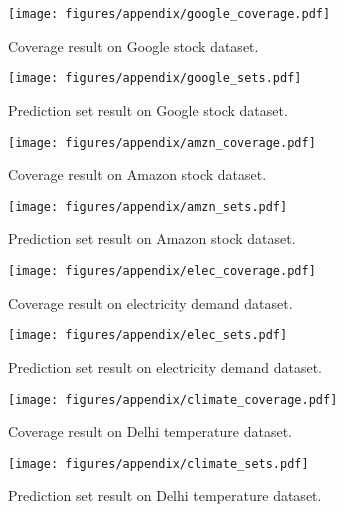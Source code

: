 \begin{figure*}[h]
  \centering
  \texttt{[image: figures/appendix/google\_coverage.pdf]}
  \caption{Coverage result on Google stock dataset.}
  \label{figure more detail1}
\end{figure*}
\begin{figure*}[h]
  \centering
  \texttt{[image: figures/appendix/google\_sets.pdf]}
  \caption{Prediction set result on Google stock dataset.}
\end{figure*}

\begin{figure*}[h]
  \centering
  \texttt{[image: figures/appendix/amzn\_coverage.pdf]}
  \caption{Coverage result on Amazon stock dataset.}
\end{figure*}
\begin{figure*}[h]
  \centering
  \texttt{[image: figures/appendix/amzn\_sets.pdf]}
  \caption{Prediction set result on Amazon stock dataset.}
\end{figure*}

\begin{figure*}[h]
  \centering
  \texttt{[image: figures/appendix/elec\_coverage.pdf]}
  \caption{Coverage result on electricity demand dataset.}
\end{figure*}
\begin{figure*}[h]
  \centering
  \texttt{[image: figures/appendix/elec\_sets.pdf]}
  \caption{Prediction set result on electricity demand dataset.}
\end{figure*}
\clearpage
\begin{figure*}[h]
  \centering
  \texttt{[image: figures/appendix/climate\_coverage.pdf]}
  \caption{Coverage result on Delhi temperature dataset.}
\end{figure*}
\begin{figure*}[h]
  \centering
  \texttt{[image: figures/appendix/climate\_sets.pdf]}
  \caption{Prediction set result on Delhi temperature dataset.}
  \label{figure more detail2}
\end{figure*}






